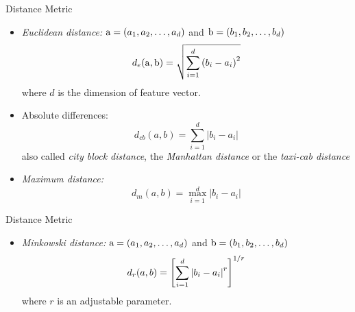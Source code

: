 %


\begin{frame}{Distance Metric}
\begin{footnotesize}
\begin{itemize}
\item \textit{\color{mycolor1}Euclidean distance:} ${\rm a}=(a_1,a_2,\ldots,a_d)$ and ${\rm b}=(b_1,b_2,\ldots,b_d)$
\begin{equation}
{d_e}({\rm a},{\rm b}) = \sqrt {\sum\limits_{i = 1}^d {{{({b_i} - {a_i})}^2}} } \nonumber
\end{equation} 
where $d$ is the dimension of feature vector.
\item Absolute differences:
\begin{equation}
{d_{cb}}(a,b) = \sum\limits_{i = 1}^d {\left| {{b_i} - {a_i}} \right|} \nonumber
\end{equation}
also called \textit{\color{mycolor1}city block distance}, the \textit{\color{mycolor1} Manhattan distance} or the \textit{\color{mycolor1} taxi-cab distance}
\item \textit{\color{mycolor1} Maximum distance:}
\[{d_m}(a,b) = \mathop {\max }\limits_{i = 1}^d \left| {{b_i} - {a_i}} \right|\]
\end{itemize}
\end{footnotesize}
\end{frame}

\begin{frame}{Distance Metric}
\begin{footnotesize}
\begin{itemize}
\item \textit{\color{mycolor1} Minkowski distance:} ${\rm a}=(a_1,a_2,\ldots,a_d)$ and ${\rm b}=(b_1,b_2,\ldots,b_d)$
\begin{equation}
{d_r}(a,b) = {\left[ {\sum\limits_{i = 1}^d {{{\left| {{b_i} - {a_i}} \right|}^r}} } \right]^{{1 \mathord{\left/
 {\vphantom {1 r}} \right.
 \kern-\nulldelimiterspace} r}}} \nonumber
\end{equation} 
where $r$ is an adjustable parameter.
\end{itemize}
\end{footnotesize}
\end{frame}

